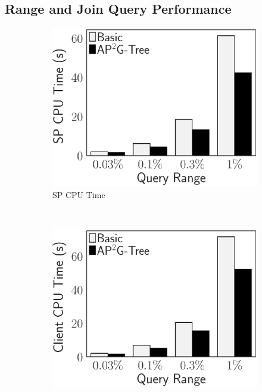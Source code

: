 \subsection{Range and Join Query Performance}


\begin{figure}[t]
    \centering
    \begin{subfigure}{.33\linewidth}
        \includegraphics[height=\ht\figbox]{exp-figs/access-control/range_sp.eps}
        \caption{SP CPU Time}
    \end{subfigure}~%
    \begin{subfigure}{.33\linewidth}
        \includegraphics[height=\ht\figbox]{exp-figs/access-control/range_user.eps}

\end{subfigure}
\end{figure}
